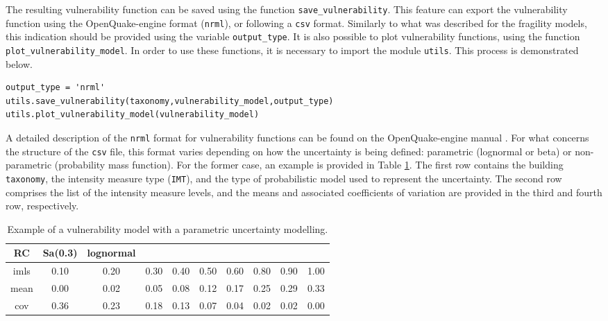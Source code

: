 The resulting vulnerability function can be saved using the function \verb=save_vulnerability=. This feature can export the vulnerability function using the OpenQuake-engine format (\verb=nrml=), or following a \verb=csv= format. Similarly to what was described for the fragility models, this indication should be provided using the variable \verb=output_type=. It is also possible to plot vulnerability functions, using the function \verb=plot_vulnerability_model=. In order to use these functions, it is necessary to import the module \verb=utils=. This process is demonstrated below.

\begin{Verbatim}[frame=single, commandchars=\\\{\}, samepage=true]
output_type = 'nrml'
utils.save_vulnerability(taxonomy,vulnerability_model,output_type)
utils.plot_vulnerability_model(vulnerability_model)
\end{Verbatim}

A detailed description of the \verb=nrml= format for vulnerability functions can be found on the OpenQuake-engine manual \citep{GEM2015}. For what concerns the structure of the \verb=csv= file, this format varies depending on how the uncertainty is being defined: parametric (lognormal or beta) or non-parametric (probability mass function). For the former case, an example is provided in Table \ref{table:vf_cont_csv}. The first row contains the building \verb=taxonomy=, the intensity measure type (\verb=IMT=), and the type of probabilistic model used to represent the uncertainty. The second row comprises the list of the intensity measure levels, and the means and associated coefficients of variation are provided in the third and fourth row, respectively.

\begin {table}[htb]
\caption{Example of a vulnerability model with a parametric uncertainty modelling.}
\label{table:vf_cont_csv}
\begin{center}
  \begin{tabular}{ | c | c | c | c | c | c | c | c | c | c |}
  \hline
RC & Sa(0.3) & lognormal &  &  &  &  &  &  & \\ \hline
imls & 0.10 & 0.20 & 0.30 & 0.40 & 0.50 & 0.60 & 0.80 & 0.90 & 1.00\\ \hline
mean & 0.00 & 0.02 & 0.05 & 0.08 & 0.12 & 0.17 & 0.25 & 0.29 & 0.33\\ \hline
cov & 0.36 & 0.23 & 0.18 & 0.13 & 0.07 & 0.04 & 0.02 & 0.02 & 0.00\\ \hline
  \end{tabular}
\end{center}
\end{table}

